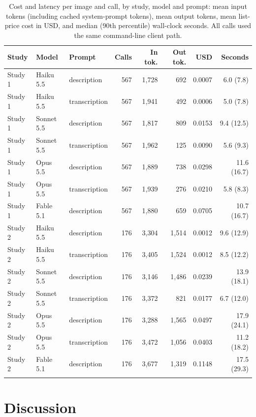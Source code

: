 \documentclass[pdflatex,sn-mathphys-num]{sn-jnl}%
\theoremstyle{thmstyleone}%
\theoremstyle{thmstyletwo}%
\theoremstyle{thmstylethree}%
\begin{document}
\begin{table}[!tbp]
\caption{Cost and latency per image and call, by study, model and prompt: mean input tokens (including cached system-prompt tokens), mean output tokens, mean list-price cost in USD, and median (90th percentile) wall-clock seconds. All calls used the same command-line client path.}\label{tab:cost}
\footnotesize
\setlength{\tabcolsep}{3pt}
\begin{tabular*}{\textwidth}{@{\extracolsep\fill}lllrrrrr}
\toprule
Study & Model & Prompt & Calls & In tok. & Out tok. & USD & Seconds \\
\midrule
Study 1 & Haiku 5.5 & description & 567 & 1{,}728 & 692 & 0.0007 & 6.0 (7.8) \\
Study 1 & Haiku 5.5 & transcription & 567 & 1{,}941 & 492 & 0.0006 & 5.0 (7.8) \\
Study 1 & Sonnet 5.5 & description & 567 & 1{,}817 & 809 & 0.0153 & 9.4 (12.5) \\
Study 1 & Sonnet 5.5 & transcription & 567 & 1{,}962 & 125 & 0.0090 & 5.6 (9.3) \\
Study 1 & Opus 5.5 & description & 567 & 1{,}889 & 738 & 0.0298 & 11.6 (16.7) \\
Study 1 & Opus 5.5 & transcription & 567 & 1{,}939 & 276 & 0.0210 & 5.8 (8.3) \\
Study 1 & Fable 5.1 & description & 567 & 1{,}880 & 659 & 0.0705 & 10.7 (16.7) \\
Study 2 & Haiku 5.5 & description & 176 & 3{,}304 & 1{,}514 & 0.0012 & 9.6 (12.9) \\
Study 2 & Haiku 5.5 & transcription & 176 & 3{,}405 & 1{,}524 & 0.0012 & 8.5 (12.2) \\
Study 2 & Sonnet 5.5 & description & 176 & 3{,}146 & 1{,}486 & 0.0239 & 13.9 (18.1) \\
Study 2 & Sonnet 5.5 & transcription & 176 & 3{,}372 & 821 & 0.0177 & 6.7 (12.0) \\
Study 2 & Opus 5.5 & description & 176 & 3{,}288 & 1{,}565 & 0.0497 & 17.9 (24.1) \\
Study 2 & Opus 5.5 & transcription & 176 & 3{,}472 & 1{,}056 & 0.0403 & 11.2 (18.2) \\
Study 2 & Fable 5.1 & description & 176 & 3{,}677 & 1{,}319 & 0.1148 & 17.5 (29.3) \\
\botrule
\end{tabular*}
\end{table}



\section{Discussion}\label{sec:discussion}
\end{document}
